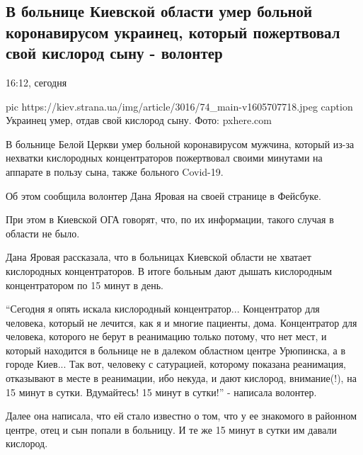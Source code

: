  
 
 

\subsection{В больнице Киевской области умер больной коронавирусом украинец, который пожертвовал свой кислород сыну - волонтер}
\label{sec:18_11_2020.news.ua.strana.2.covid_death_syn_kislorod}

16:12, сегодня

\ifcmt
pic https://kiev.strana.ua/img/article/3016/74_main-v1605707718.jpeg
caption Украинец умер, отдав свой кислород сыну. Фото: pxhere.com 
\fi

В больнице Белой Церкви умер больной коронавирусом мужчина, который из-за
нехватки кислородных концентраторов пожертвовал своими минутами на
аппарате в пользу сына, также больного Covid-19.

Об этом сообщила волонтер Дана Яровая на своей странице в Фейсбуке.

При этом в Киевской ОГА говорят, что, по их информации, такого случая в
области не было.

Дана Яровая рассказала, что в больницах Киевской области не хватает
кислородных концентраторов. В итоге больным дают дышать кислородным
концентратором по 15 минут в день.

\enquote{Сегодня я опять искала кислородный концентратор... Концентратор для
человека, который не лечится, как я и многие пациенты, дома. Концентратор
для человека, которого не берут в реанимацию только потому, что нет мест,
и который находится в больнице не в далеком областном центре Урюпинска, а
в городе Киев... Так вот, человеку с сатурацией, которому показана
реанимация, отказывают в месте в реанимации, ибо некуда, и дают кислород,
внимание(!), на 15 минут в сутки. Вдумайтесь! 15 минут в сутки!} -
написала волонтер.

Далее она написала, что ей стало известно о том, что у ее знакомого в
районном центре, отец и сын попали в больницу. И те же 15 минут в сутки им
давали кислород.

